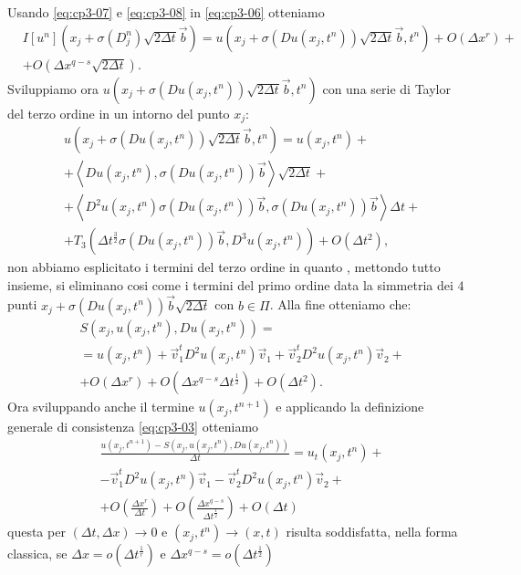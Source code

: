 Usando \eqref{eq:cp3-07} e \eqref{eq:cp3-08} in \eqref{eq:cp3-06} otteniamo
\[
\begin{split}
&I[u^n](x_j+\sigma(D_j^n)\sqrt{2\Delta t}\vec{b})=u(x_j+\sigma(Du(x_j,t^n))\sqrt{2\Delta t}\vec{b},t^n)+O(\Delta x^r)+ \\
& +O(\Delta x^{q-s}\sqrt{2\Delta t}).
\end{split}
\]
Sviluppiamo ora $u(x_j+\sigma(Du(x_j,t^n))\sqrt{2\Delta t}\vec{b},t^n)$ con una serie di Taylor del terzo ordine in un intorno del punto $x_j$:
\begin{equation}
\label{eq:cp3-09}
\begin{split}
&u(x_j+\sigma(Du(x_j,t^n))\sqrt{2\Delta t}\vec{b},t^n) = u(x_j,t^n)+ \\
&+\left<Du(x_j,t^n),\sigma(Du(x_j,t^n))\vec{b}\right>\sqrt{2\Delta t} +\\
&+\left<D^2u(x_j,t^n)\sigma(Du(x_j,t^n))\vec{b},\sigma(Du(x_j,t^n))\vec{b}\right>\Delta t + \\
&+T_3(\Delta t^{\frac{3}{2}}\sigma(Du(x_j,t^n))\vec{b},D^3u(x_j,t^n))+O(\Delta t^2), 
\end{split}
\end{equation}
non abbiamo esplicitato i termini del terzo ordine in quanto , mettondo tutto insieme, si eliminano cosi come i termini del primo ordine data la simmetria dei $4$ punti $x_j+\sigma(Du(x_j,t^n))\vec{b}\sqrt{2\Delta t}$ con $b\in\Pi$. Alla fine otteniamo che:
\begin{equation}
\label{eq:cp3-010}
\begin{split}
& S(x_j,u(x_j,t^n),Du(x_j,t^n)) = \\
& = u(x_j,t^n) + \vec{v}_1^tD^2u(x_j,t^n)\vec{v}_1 + \vec{v}_2^tD^2u(x_j,t^n)\vec{v}_2 + \\
& + O(\Delta x^r) + O(\Delta x^{q-s}\Delta t^{\frac{1}{2}}) + O(\Delta t^2).
\end{split}
\end{equation}
Ora sviluppando  anche il termine $u(x_j,t^{n+1})$ e applicando la definizione generale di consistenza \eqref{eq:cp3-03} otteniamo 
\[
\begin{split}
&\frac{u(x_j,t^{n+1})-S(x_j,u(x_j,t^n),Du(x_j,t^n))}{\Delta t}= u_t(x_j,t^n) + \\
&  -\vec{v}_1^tD^2u(x_j,t^n)\vec{v}_1 -\vec{v}_2^tD^2u(x_j,t^n)\vec{v}_2 + \\
& +O(\frac{\Delta x^r}{\Delta t}) + O(\frac{\Delta x^{q-s}}{\Delta t^{\frac{1}{2}}}) + O(\Delta t)
\end{split}
\]
questa per $(\Delta t,\Delta x)\to 0$ e $(x_j,t^n)\to(x,t)$ risulta
soddisfatta, nella forma classica, se $\Delta x = o(\Delta
t^{\frac{1}{r}})$ e $\Delta x^{q-s}=o(\Delta t^{\frac{1}{2}})$

